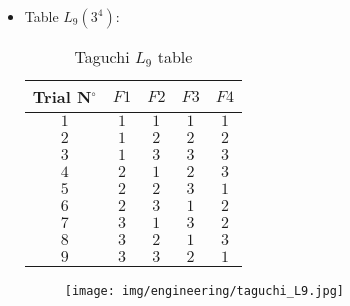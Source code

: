 \begin{itemize}
		\item Table $L_9 (3^4)$:
		\begin{table}[H]\centering
			\begin{center}
			\begin{tabular}{|c|c|c|c|c|}
			\hline
			\multicolumn{1}{c}{\cellcolor{black!30}\textbf{Trial N${}^\circ$}} & 
			\multicolumn{1}{c}{\cellcolor{black!30}$F1$} & 
			\multicolumn{1}{c}{\cellcolor{black!30}$F2$} & 
			\multicolumn{1}{c}{\cellcolor{black!30}$F3$} & 
			\multicolumn{1}{c}{\cellcolor{black!30}$F4$} \\ \hline
		  	$1$ & $1$ & $1$ & $1$ & $1$\\ \hline
		  	$2$ & $1$ & $2$ & $2$ & $2$\\ \hline
		  	$3$ & $1$ & $3$ & $3$ & $3$\\ \hline
		  	$4$ & $2$ & $1$ & $2$ & $3$\\ \hline
		  	$5$ & $2$ & $2$ & $3$ & $1$\\ \hline
		  	$6$ & $2$ & $3$ & $1$ & $2$\\ \hline
		  	$7$ & $3$ & $1$ & $3$ & $2$\\ \hline
		  	$8$ & $3$ & $2$ & $1$ & $3$\\ \hline
		  	$9$ & $3$ & $3$ & $2$ & $1$\\ \hline
		 		\end{tabular}
			\end{center}
			\caption{Taguchi $L_9$ table}
		\end{table}
		\begin{figure}[H]
			\begin{center}
			\texttt{[image: img/engineering/taguchi\_L9.jpg]}
			\end{center}	
		\end{figure}
		

\end{itemize}
